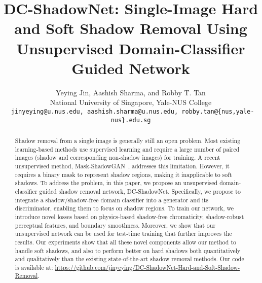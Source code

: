 \documentclass[10pt,twocolumn,letterpaper]{article}
\begin{document}
	
\title{DC-ShadowNet: Single-Image Hard and Soft Shadow Removal Using  \\
	Unsupervised Domain-Classifier Guided Network}

\author{Yeying Jin, Aashish Sharma, and Robby T. Tan\\
	National University of Singapore, Yale-NUS College\\
	{\tt\small 
		jinyeying@u.nus.edu, aashish.sharma@u.nus.edu, robby.tan@\{nus,yale-nus\}.edu.sg}
	}
\maketitle
\thispagestyle{empty}
\def\thefootnote{}\def\thefootnote{\arabic{footnote}}

\maketitle
\ificcvfinal\thispagestyle{empty}\fi

\begin{abstract}
Shadow removal from a single image is generally still an open problem. Most existing learning-based methods use supervised learning and require a large number of paired images (shadow and corresponding non-shadow images) for training. A recent unsupervised method, Mask-ShadowGAN~\cite{Hu19}, addresses this limitation. However, it requires a binary mask to represent shadow regions, making it inapplicable to soft shadows. To address the problem, in this paper, we propose an unsupervised domain-classifier guided shadow removal network, DC-ShadowNet. Specifically, we propose to integrate a shadow/shadow-free domain classifier into a generator and its discriminator, enabling them to focus on shadow regions. To train our network, we introduce novel losses based on physics-based shadow-free chromaticity, shadow-robust perceptual features, and boundary smoothness. Moreover, we show that our unsupervised network can be used for test-time training that further improves the results. Our experiments show that all these novel components allow our method to handle soft shadows, and also to perform better on hard shadows both quantitatively and qualitatively than the existing state-of-the-art shadow removal methods.
Our code is available at: \url{https://github.com/jinyeying/DC-ShadowNet-Hard-and-Soft-Shadow-Removal}.
\end{abstract}
\end{document}
